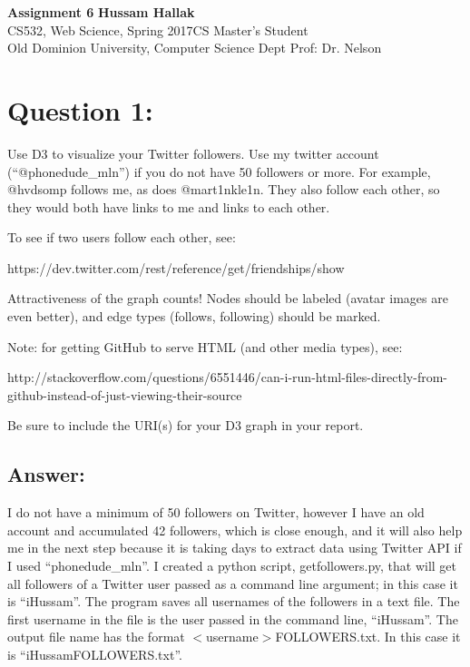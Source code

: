 \documentclass[a4paper, 11pt]{article}
\begin{document}
\noindent
\large\textbf{Assignment 6} \hfill \textbf{Hussam Hallak} \\
\normalsize CS532, Web Science, Spring 2017\hfill CS Master's Student \\
Old Dominion University, Computer Science Dept \hfill Prof: Dr. Nelson 

\section*{Question 1:}
Use D3 to visualize your Twitter followers.  Use my twitter account
(``@phonedude\_mln'') if you do not have 50 followers or more.  For example,
@hvdsomp follows me, as does @mart1nkle1n. They also follow each
other, so they would both have links to me and links to each other.

To see if two users follow each other, see:

https://dev.twitter.com/rest/reference/get/friendships/show

Attractiveness of the graph counts!  Nodes should be labeled (avatar
images are even better), and edge types (follows, following) should
be marked.

Note: for getting GitHub to serve HTML (and other media types), see:

http://stackoverflow.com/questions/6551446/can-i-run-html-files-directly-from-github-instead-of-just-viewing-their-source

Be sure to include the URI(s) for your D3 graph in your report. 

\subsection*{Answer:}
I do not have a minimum of 50 followers on Twitter, however I have an old account and accumulated 42 followers, which is close enough, and it will also help me in the next step because it is taking days to extract data using Twitter API if I used ``phonedude\_mln''. I created a python script, getfollowers.py, that will get all followers of a Twitter user passed as a command line argument; in this case it is ``iHussam''. The program saves all usernames of the followers in a text file. The first username in the file is the user passed in the command line, ``iHussam''. The output file name has the format $<$username$>$FOLLOWERS.txt. In this case it is ``iHussamFOLLOWERS.txt''.


\end{document}
